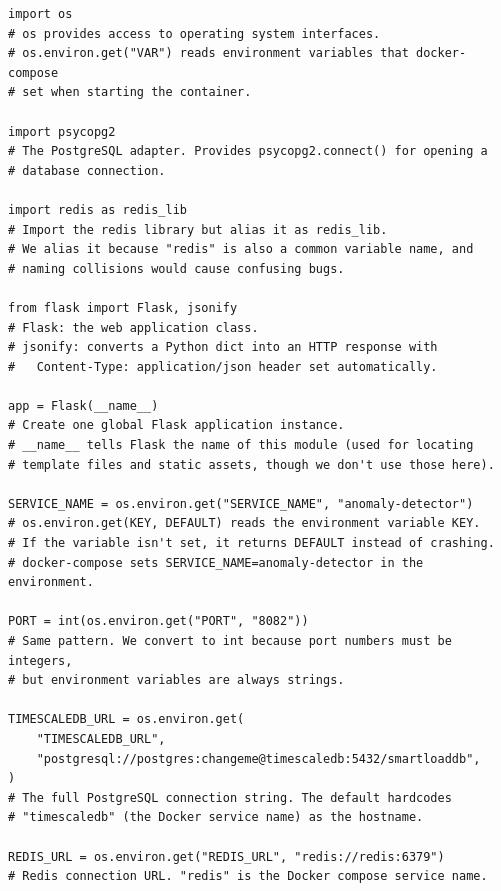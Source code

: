 \documentclass[12pt, a4paper]{article}
\begin{document}
\begin{lstlisting}[style=python, caption={services/anomaly-detector/app.py --- imports and configuration}]
import os
# os provides access to operating system interfaces.
# os.environ.get("VAR") reads environment variables that docker-compose
# set when starting the container.

import psycopg2
# The PostgreSQL adapter. Provides psycopg2.connect() for opening a
# database connection.

import redis as redis_lib
# Import the redis library but alias it as redis_lib.
# We alias it because "redis" is also a common variable name, and
# naming collisions would cause confusing bugs.

from flask import Flask, jsonify
# Flask: the web application class.
# jsonify: converts a Python dict into an HTTP response with
#   Content-Type: application/json header set automatically.

app = Flask(__name__)
# Create one global Flask application instance.
# __name__ tells Flask the name of this module (used for locating
# template files and static assets, though we don't use those here).

SERVICE_NAME = os.environ.get("SERVICE_NAME", "anomaly-detector")
# os.environ.get(KEY, DEFAULT) reads the environment variable KEY.
# If the variable isn't set, it returns DEFAULT instead of crashing.
# docker-compose sets SERVICE_NAME=anomaly-detector in the environment.

PORT = int(os.environ.get("PORT", "8082"))
# Same pattern. We convert to int because port numbers must be integers,
# but environment variables are always strings.

TIMESCALEDB_URL = os.environ.get(
    "TIMESCALEDB_URL",
    "postgresql://postgres:changeme@timescaledb:5432/smartloaddb",
)
# The full PostgreSQL connection string. The default hardcodes
# "timescaledb" (the Docker service name) as the hostname.

REDIS_URL = os.environ.get("REDIS_URL", "redis://redis:6379")
# Redis connection URL. "redis" is the Docker compose service name.
\end{lstlisting}
\end{document}
